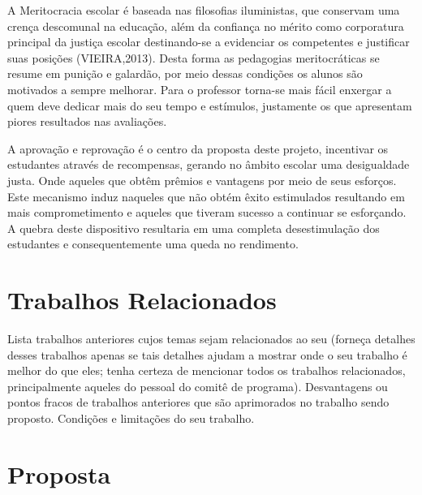 \documentclass[
	article,			%
	11pt,				%
	oneside,			%
	a4paper,			%
	english,			%
	brazil,				%
	sumario=tradicional
	]{abntex2}
\begin{document}
A Meritocracia escolar é baseada nas filosofias iluministas, que conservam uma crença descomunal na educação, além da confiança no mérito como corporatura  principal da justiça escolar destinando-se a evidenciar os competentes e justificar suas posições (VIEIRA,2013).  Desta forma as pedagogias meritocráticas se resume em punição e galardão, por meio dessas condições os alunos são motivados a sempre melhorar. Para o professor torna-se mais fácil enxergar a quem deve dedicar mais do seu tempo e estímulos, justamente os que apresentam  piores resultados nas avaliações. 

A aprovação e reprovação é o centro da proposta deste projeto, incentivar os estudantes através de recompensas, gerando no âmbito escolar uma desigualdade justa. Onde aqueles que obtêm prêmios e vantagens por meio de seus esforços. Este mecanismo induz naqueles que não obtém êxito estimulados resultando em mais comprometimento  e aqueles que tiveram sucesso a continuar se esforçando. A quebra deste dispositivo resultaria em uma completa desestimulação dos estudantes  e consequentemente uma queda no rendimento. 



\section{Trabalhos Relacionados}

Lista trabalhos anteriores cujos temas sejam relacionados ao seu (forneça detalhes desses trabalhos apenas se tais detalhes ajudam a mostrar onde o seu trabalho é melhor do que eles; tenha certeza de mencionar todos os trabalhos relacionados, principalmente aqueles do pessoal do comitê de programa). Desvantagens ou pontos fracos de trabalhos anteriores que são aprimorados no trabalho sendo proposto. Condições e limitações do seu trabalho.


\section{Proposta}
\end{document}
